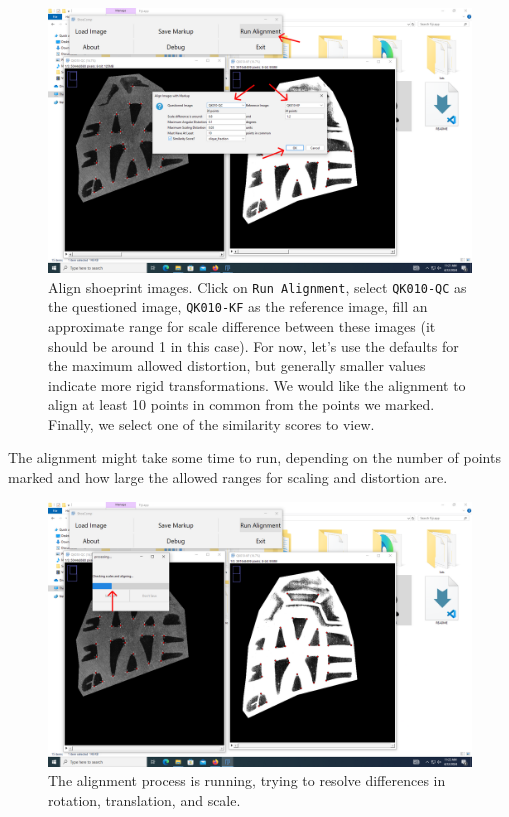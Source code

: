 \documentclass{csafedoc}
\begin{document}
\begin{figure}[H]
	\begin{center}
		\includegraphics[width=0.8\linewidth]{images/step_8a-anno.png}
	\end{center}
	\caption{Align shoeprint images. Click on \texttt{Run Alignment}, select \texttt{QK010-QC} as the questioned image,
		\texttt{QK010-KF} as the reference image, fill an approximate range for scale difference
		between these images (it should be around 1 in this case). For now, let's use the defaults
		for the maximum allowed distortion, but generally smaller values indicate more rigid
		transformations. We would like the alignment to align at least 10 points in common from
		the points we marked. Finally, we select one of the similarity scores to view.}
	\label{fig:step8a}
\end{figure}

The alignment might take some time to run, depending on the number of points marked and
how large the allowed ranges for scaling and distortion are.

\begin{figure}[H]
	\begin{center}
		\includegraphics[width=0.8\linewidth]{images/step_8b-anno.png}
	\end{center}
	\caption{The alignment process is running, trying to resolve differences in rotation,
		translation, and scale.}
	\label{fig:step8b}
\end{figure}
\end{document}
